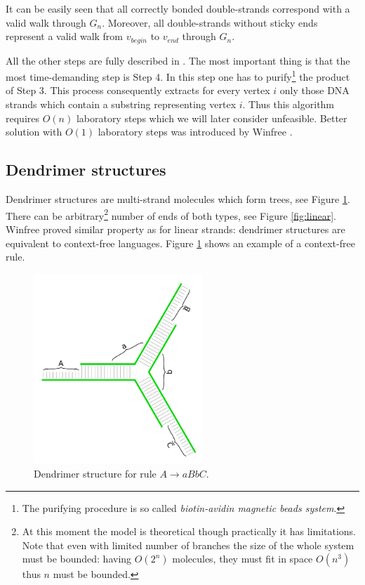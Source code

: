 		It can be easily seen that all correctly bonded double-strands correspond with a valid walk through $G_n$. Moreover, all double-strands without sticky ends represent a valid walk from $v_{begin}$ to $v_{end}$ through $G_n$.
		
		All the other steps are fully described in \cite{adleman94}. The most important thing is that the most time-demanding step is Step 4. In this step one has to purify\footnote{The purifying procedure is so called {\em biotin-avidin magnetic beads system}.} the product of Step 3. This process consequently extracts for every vertex $i$ only those DNA strands which contain a substring representing vertex $i$. Thus this algorithm requires $O(n)$ laboratory steps which we will later consider unfeasible. Better solution with $O(1)$ laboratory steps was introduced by Winfree \cite{winfree_phd}.
	
	\subsection{Dendrimer structures}
	\label{sec:dendrimer}
		
		Dendrimer structures are multi-strand molecules which form trees, see Figure \ref{fig:dendrimer}. There can be arbitrary\footnote{At this moment the model is theoretical though practically it has limitations. Note that even with limited number of branches the size of the whole system must be bounded: having $O(2^n)$ molecules, they must fit in space $O(n^3)$ thus $n$ must be bounded.} number of ends of both types, see Figure \ref{fig:linear}. Winfree \cite{winfree_phd} proved similar property as for linear strands: dendrimer structures are equivalent to context-free languages. Figure \ref{fig:dendrimer} shows an example of a context-free rule.
		
		\begin{figure}[h]
		\begin{center}
			\includegraphics[width=0.568\textwidth]{./figures/strand_types/dendrimer.pdf}
			\caption{Dendrimer structure for rule $A\rightarrow aBbC$.}
			\label{fig:dendrimer}
		\end{center}
		\end{figure}
	
